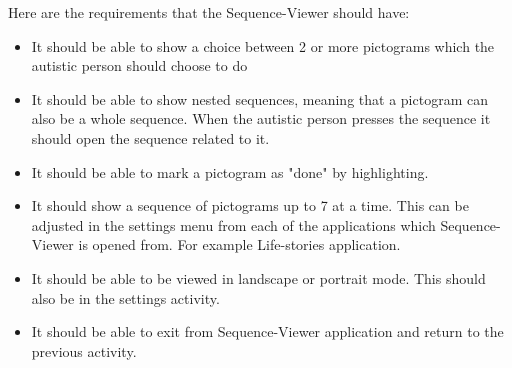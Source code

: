 Here are the requirements that the Sequence-Viewer should have:
\begin{itemize}
\item It should be able to show a choice between 2 or more pictograms which the autistic person should choose to do
\item It should be able to show nested sequences, meaning that a pictogram can also be a whole sequence. When the autistic person presses the sequence it should open the sequence related to it.
\item It should be able to mark a pictogram as "done" by highlighting.
\item It should show a sequence of pictograms up to 7 at a time. This can be adjusted in the settings menu from each of the applications which Sequence-Viewer is opened from. For example Life-stories application.
\item It should be able to be viewed in landscape or portrait mode. This should also be in the settings activity.
\item It should be able to exit from Sequence-Viewer application and return to the previous activity.
\end{itemize}